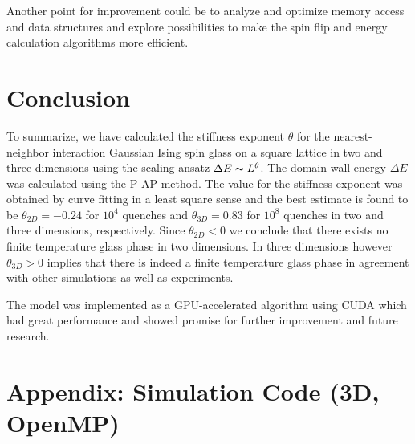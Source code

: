 \documentclass[paper=a4, fontsize=11pt]{scrartcl} %
\numberwithin{equation}{section} %
\numberwithin{figure}{section} %
\numberwithin{table}{section} %
\begin{document}
Another point for improvement could be to analyze and optimize memory access and data structures and explore possibilities to make the spin flip and energy calculation algorithms more efficient.


\section{Conclusion}
\label{sec:conclusions}
To summarize, we have calculated the stiffness exponent $\theta$ for the nearest-neighbor interaction Gaussian Ising spin glass on a square lattice in two and three dimensions using the scaling ansatz $\Delta E \thicksim L^\theta$. The domain wall energy $\Delta E$ was calculated using the P-AP method. The value for the stiffness exponent was obtained by curve fitting in a least square sense and the best estimate is found to be $\theta_{2D}=-0.24$ for $10^4$ quenches and $\theta_{3D}=0.83$ for $10^8$ quenches in two and three dimensions, respectively. Since $\theta_{2D}<0$ we conclude that there exists no finite temperature glass phase in two dimensions. In three dimensions however $\theta_{3D}>0$ implies that there is indeed a finite temperature glass phase in agreement with other simulations as well as experiments\cite{hartmann}\cite{fisher}\cite{carter}. 

The model was implemented as a GPU-accelerated algorithm using CUDA which had great performance and showed promise for further improvement and future research.

\pagebreak
\section*{Appendix: Simulation Code (3D, OpenMP)}


\pagebreak
\end{document}
